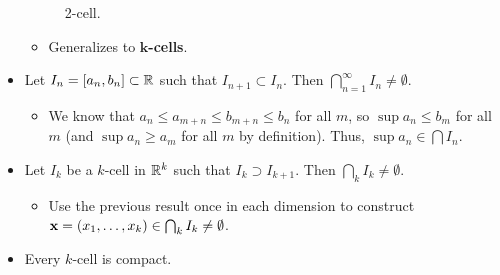 \documentclass[../../notes.tex]{subfiles}
\begin{document}
\begin{itemize}
\begin{figure}[h!]
        \caption{2-cell.}
        \label{fig:2cell}
    \end{figure}
    \begin{itemize}
        \item Generalizes to \textbf{$\bm{k}$-cells}.
    \end{itemize}
    \item Let $I_n=[a_n,b_n]\subset\mathbb{R}$ such that $I_{n+1}\subset I_n$. Then $\bigcap_{n=1}^\infty I_n\neq\emptyset$.
    \begin{itemize}
        \item We know that $a_n\leq a_{m+n}\leq b_{m+n}\leq b_n$ for all $m$, so $\sup a_n\leq b_m$ for all $m$ (and $\sup a_n\geq a_m$ for all $m$ by definition). Thus, $\sup a_n\in\bigcap I_n$.
    \end{itemize}
    \item Let $I_k$ be a $k$-cell in $\mathbb{R}^k$ such that $I_k\supset I_{k+1}$. Then $\bigcap_kI_k\neq\emptyset$.
    \begin{itemize}
        \item Use the previous result once in each dimension to construct $\mathbf{x}=(x_1,\dots,x_k)\in\bigcap_kI_k\neq\emptyset$.
    \end{itemize}
    \item Every $k$-cell is compact.
    \begin{figure}[h!]
        \centering
\end{figure}
\end{itemize}
\end{document}
